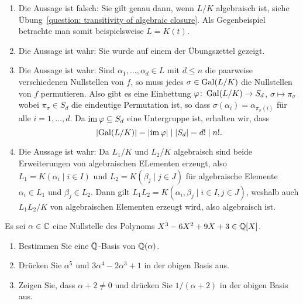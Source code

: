 \begin{solution}
\begin{enumerate}
    \item
      Die Aussage ist falsch:
      Sie gilt genau dann, wenn $L/K$ algebraisch ist, siehe Übung~\ref{question: transitivity of algebraic closure}.
      Als Gegenbeispiel betrachte man somit beispielsweise $L = K(t)$.
      
    \item
      Die Aussage ist wahr:
      Sie wurde auf einem der Übungszettel gezeigt.
      
    \item
      Die Aussage ist wahr:
      Sind $\alpha_1, \dotsc, \alpha_d \in L$ mit $d \leq n$ die paarweise verschiedenen Nullstellen von $f$, so muss jedes $\sigma \in \operatorname{Gal}(L/K)$ die Nullstellen von $f$ permutieren.
      Also gibt es eine Einbettung $\varphi \colon \operatorname{Gal}(L/K) \to S_d$, $\sigma \mapsto \pi_\sigma$ wobei $\pi_\sigma \in S_d$ die eindeutige Permutation ist, so dass $\sigma(\alpha_i) = \alpha_{\pi_\sigma(i)}$ für alle $i = 1, \dotsc, d$.
      Da $\operatorname{im} \varphi \subseteq S_d$ eine Untergruppe ist, erhalten wir, dass
      \[
              |{\operatorname{Gal}(L/K)}|
        =     |{\operatorname{im} \varphi}|
        \mid  |S_d|
        =     d!
        \mid  n!.
      \]
    
    \item
      Die Aussage ist wahr:
      Da $L_1/K$ und $L_2/K$ algebraisch sind beide Erweiterungen von algebraischen ELementen erzeugt, also $L_1 = K(\alpha_i \mid i \in I)$ und $L_2 = K(\beta_j \mid j \in J)$ für algebraische Elemente $\alpha_i \in L_1$ und $\beta_j \in L_2$.
      Dann gilt $L_1 L_2 = K(\alpha_i, \beta_j \mid i \in I, j \in J)$, weshalb auch $L_1 L_2/K$ von algebraischen Elementen erzeugt wird, also algebraisch ist.
  \end{enumerate}
\end{solution}


\begin{question}
  Es sei $\alpha \in \mathbb{C}$ eine Nullstelle des Polynoms $X^3 - 6 X^2 + 9 X + 3 \in \mathbb{Q}[X]$.
  \begin{enumerate}
    \item
      Bestimmen Sie eine $\mathbb{Q}$-Basis von $\mathbb{Q}(\alpha)$.
    \item
      Drücken Sie $\alpha^5$ und $3 \alpha^4 - 2 \alpha^3 + 1$ in der obigen Basis aus.
    \item
      Zeigen Sie, dass $\alpha + 2 \neq 0$ und drücken Sie $1/(\alpha + 2)$ in der obigen Basis aus.
  \end{enumerate}
\end{question}


